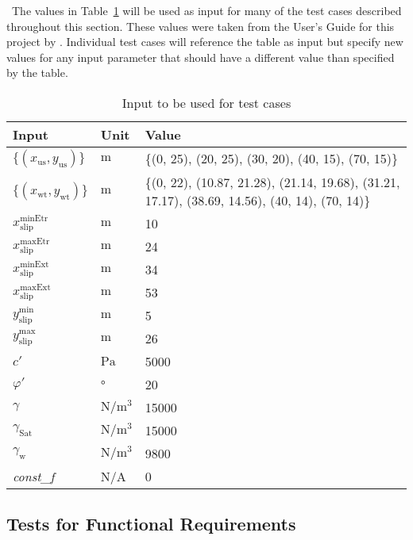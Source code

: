 \documentclass[12pt, titlepage]{article}
\begin{document}
~\newline \noindent The values in Table~\ref{Inputs} will be used as input for 
many of the test cases described throughout this section. These values were 
taken from the User's Guide for this project by \cite{UserGuide}. Individual 
test cases will reference the table as input but specify new values for any 
input parameter that should have a different value than specified by the table.

\begin{table}[!h]
	\renewcommand{\arraystretch}{1.5}
	\begin{tabularx}{1.0\textwidth}{p{2cm} l X}
		\toprule \textbf{Input} &
		\textbf{Unit} & \textbf{Value}\\ \midrule
		$\{\left(x_\text{us},y_\text{us}\right)\}$ & $\text{m}$ & \{(0, 25), 
		(20, 25), (30, 20), (40, 15), (70, 15)\}\\
		$\{\left(x_\text{wt},y_\text{wt}\right)\}$ & $\text{m}$ & \{(0, 22), 
		(10.87, 21.28), (21.14, 19.68), (31.21, 17.17), (38.69, 14.56), (40, 
		14), (70, 14)\}\\
		${x_\text{slip}^\text{minEtr}}$ & $\text{m}$ & 10\\
		${x_\text{slip}^\text{maxEtr}}$ & $\text{m}$ & 24\\
		${x_\text{slip}^\text{minExt}}$ & $\text{m}$ & 34\\
		${x_\text{slip}^\text{maxExt}}$ & $\text{m}$ & 53\\
		${y_\text{slip}^\text{min}}$ & $\text{m}$ & 5\\
		${y_\text{slip}^\text{max}}$ & $\text{m}$ & 26\\
		$c'$ & $\si{\pascal}$ & 5000 \\
		$\varphi'$ & \si{\degree} & 20\\
		$\gamma$ & $\si{\newton\per\meter\cubed}$ & 15000 \\
		$\gamma_{\text{Sat}}$ & $\si{\newton\per\meter\cubed}$ & 15000 \\
		$\gamma_{\text{w}}$ & $\si{\newton\per\meter\cubed}$ & 9800 \\
		\textit{const\_f} & N/A & 0\\ 
		\bottomrule
	\end{tabularx}
	\caption{Input to be used for test cases}
	\label{Inputs}
\end{table}

\subsection{Tests for Functional Requirements}
\end{document}
